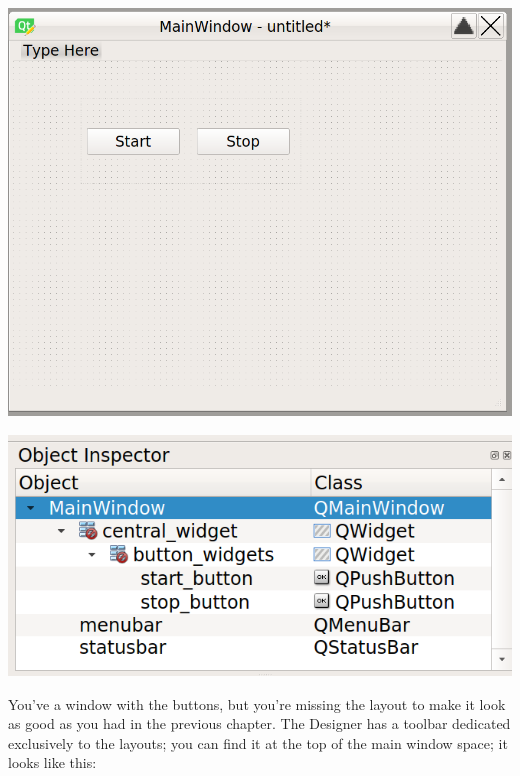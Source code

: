 \begin{minipage}{0.45\linewidth}
    \centering
    \includegraphics[width=\textwidth]{images/Chapter_09/05_main_window_buttons.png}
\end{minipage}
\hspace{0.5cm}
\begin{minipage}{0.45\linewidth}
    \centering
    \includegraphics[width=\textwidth]{images/Chapter_09/05_main_window_structure.png}
\end{minipage}


You've a window with the buttons, but you're missing the layout to make it look as good as you had in the previous chapter. The Designer has a toolbar dedicated exclusively to the layouts; you can find it at the top of the main window space; it looks like this:

